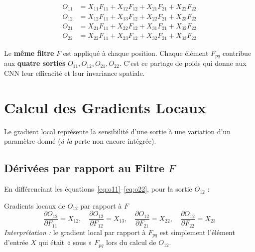 \documentclass[12pt, a4paper]{article}
\begin{document}
\begin{mathbox}
\begin{align}
    O_{11} &= X_{11}F_{11} + X_{12}F_{12} + X_{21}F_{21} + X_{22}F_{22} \label{eq:o11}\\
    O_{12} &= X_{12}F_{11} + X_{13}F_{12} + X_{22}F_{21} + X_{23}F_{22} \label{eq:o12}\\
    O_{21} &= X_{21}F_{11} + X_{22}F_{12} + X_{31}F_{21} + X_{32}F_{22} \label{eq:o21}\\
    O_{22} &= X_{22}F_{11} + X_{23}F_{12} + X_{32}F_{21} + X_{33}F_{22} \label{eq:o22}
\end{align}
\end{mathbox}

\begin{infobox}[title={Observation clé : le partage de poids}]
Le \textbf{même filtre} $F$ est appliqué à chaque position. Chaque élément $F_{pq}$
contribue aux \textbf{quatre sorties} $O_{11}, O_{12}, O_{21}, O_{22}$.
C'est ce partage de poids qui donne aux CNN leur efficacité et leur invariance spatiale.
\end{infobox}

\section{Calcul des Gradients Locaux}

Le gradient local représente la sensibilité d'une sortie à une variation
d'un paramètre donné (\textit{à la}  perte non encore intégrée).

\subsection{Dérivées par rapport au Filtre $F$}

En différenciant les équations~\eqref{eq:o11}--\eqref{eq:o22}, pour la sortie
$O_{12}$ :

\begin{stepbox}{Gradients locaux de $O_{12}$ par rapport à $F$}
\begin{equation}
    \frac{\partial O_{12}}{\partial F_{11}} = X_{12},\quad
    \frac{\partial O_{12}}{\partial F_{12}} = X_{13},\quad
    \frac{\partial O_{12}}{\partial F_{21}} = X_{22},\quad
    \frac{\partial O_{12}}{\partial F_{22}} = X_{23}
\end{equation}
\textit{Interprétation :} le gradient local par rapport à $F_{pq}$ est simplement
l'élément d'entrée $X$ qui était « sous » $F_{pq}$ lors du calcul de $O_{12}$.
\end{stepbox}
\end{document}
